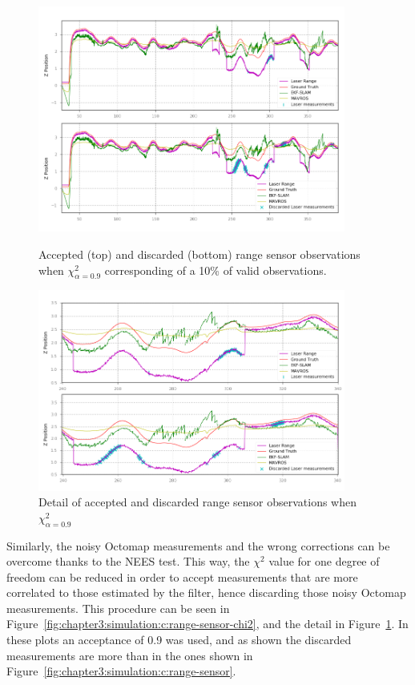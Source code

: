 \begin{figure}
    \centering
    \includegraphics[width=0.9\textwidth]{Images/fig23-laser-chi2.png}
    \caption[Accepted and discarded range sensor observations when $\chi_{\alpha=0.9}^2$]{Accepted (top) and discarded (bottom) range sensor observations when $\chi_{\alpha=0.9}^2$ corresponding of a 10\% of valid observations.}
    \label{fig:chapter3:simulation:c:range-sensor-chi2}
    \centering
    \includegraphics[width=0.9\textwidth]{Images/fig23-laser-chi2-detail.png}
    \caption{Detail of accepted and discarded range sensor observations when $\chi_{\alpha=0.9}^2$}
    \label{fig:chapter3:simulation:c:range-sensor-detail-chi2}
\end{figure}
Similarly, the noisy Octomap measurements and the wrong corrections can be overcome thanks to the \ac{NEES} test. This way, the $\chi^2$ value for one degree of freedom can be reduced in order to accept measurements that are more correlated to those estimated by the filter, hence discarding those noisy Octomap measurements. This procedure can be seen in Figure~\ref{fig:chapter3:simulation:c:range-sensor-chi2}, and the detail in Figure~\ref{fig:chapter3:simulation:c:range-sensor-detail-chi2}. In these plots an acceptance of 0.9 was used, and as shown the discarded measurements are more than in the ones shown in Figure~\ref{fig:chapter3:simulation:c:range-sensor}.\\




















